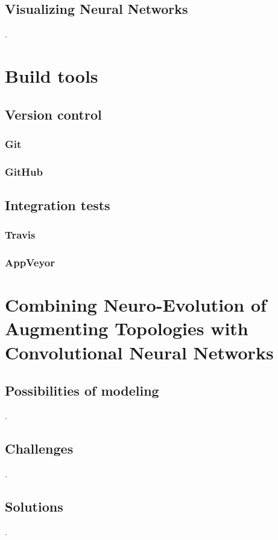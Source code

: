 \documentclass[11pt]{article}
\begin{document}
		\subsection{Visualizing Neural Networks}
			.
	\newpage

	\section{Build tools}
		\subsection{Version control}
			\subsubsection{Git}
				
			\subsubsection{GitHub}
				
		\subsection{Integration tests}
			
			\subsubsection{Travis}
				
			\subsubsection{AppVeyor}
				
	\newpage

	\section{Combining Neuro-Evolution of Augmenting Topologies with Convolutional Neural Networks}
		\subsection{Possibilities of modeling}
			.
		\subsection{Challenges}
			.
		\subsection{Solutions}
			.
\end{document}
